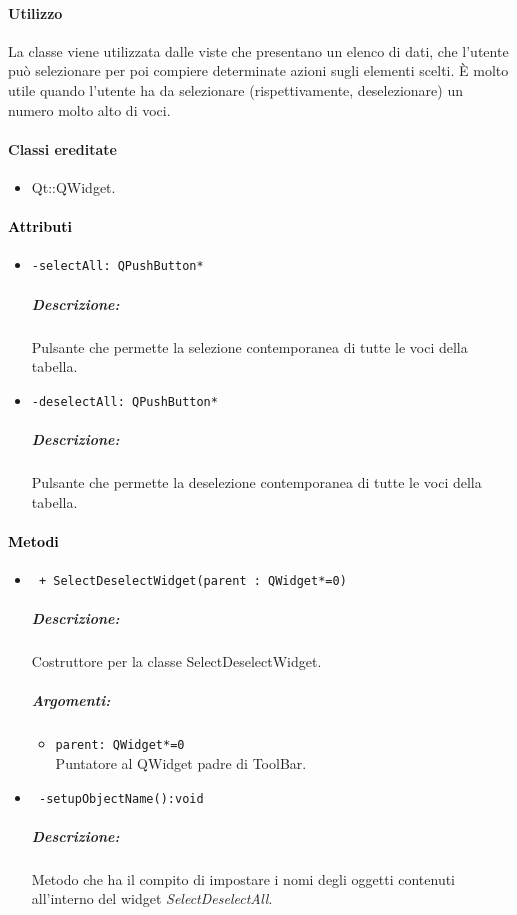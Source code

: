 \paragraph{Utilizzo\\}
La classe viene utilizzata dalle viste che presentano un elenco di dati, che l'utente può selezionare per poi compiere determinate azioni sugli elementi scelti. È molto utile quando l'utente ha da selezionare (rispettivamente, deselezionare) un numero molto alto di voci.
\paragraph{Classi ereditate\\}
\begin{itemize}
\item Qt::QWidget.
\end{itemize}
\paragraph{\textcolor{black}{Attributi\\}}
\begin{itemize}
\item \color{teal}\verb!-selectAll: QPushButton*!
\color{black}
\subparagraph{Descrizione:} Pulsante che permette la selezione contemporanea di tutte le voci della tabella.

\item \color{teal}\verb!-deselectAll: QPushButton*!
\color{black}
\subparagraph{Descrizione:} Pulsante che permette la deselezione contemporanea di tutte le voci della tabella.
\end{itemize}
\paragraph{\textcolor{black}{Metodi\\}}
\begin{itemize}
\item \color{blue}\verb! + SelectDeselectWidget(parent : QWidget*=0)!
\color{black}
\subparagraph{Descrizione:} Costruttore per la classe SelectDeselectWidget.
\subparagraph{Argomenti:}
\begin{itemize}
\item \color{RoyalPurple} \verb!parent: QWidget*=0 ! \\ Puntatore al QWidget padre di ToolBar.
\end{itemize}

\item \color{blue}\verb! -setupObjectName():void!
\color{black}
\subparagraph{Descrizione:} Metodo che ha il compito di impostare i nomi degli oggetti contenuti all'interno del widget \emph{SelectDeselectAll}.
\end{itemize}
\color{black}
\pagebreak


